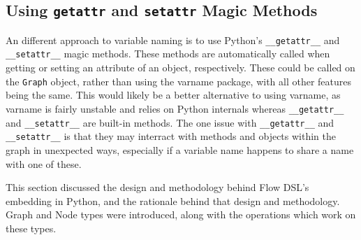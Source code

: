 \subsection{Using \texttt{\textunderscore\textunderscore getattr\textunderscore\textunderscore} and \texttt{\textunderscore\textunderscore setattr\textunderscore\textunderscore} Magic Methods}
An different approach to variable naming is to use Python's \lstinline|__getattr__| and \lstinline|__setattr__| magic methods. These methods are automatically called when getting or setting an attribute of an object, respectively. These could be called on the \lstinline|Graph| object, rather than using the varname package, with all other features being the same. This would likely be a better alternative to using varname, as varname is fairly unstable and relies on Python internals whereas \lstinline|__getattr__| and \lstinline|__setattr__| are built-in methods. The one issue with \lstinline|__getattr__| and \lstinline|__setattr__| is that they may interract with methods and objects within the graph in unexpected ways, especially if a variable name happens to share a name with one of these.

\par\noindent\hrulefill\par

This section discussed the design and methodology behind Flow DSL's embedding in Python, and the rationale behind that design and methodology. Graph and Node types were introduced, along with the operations which work on these types.